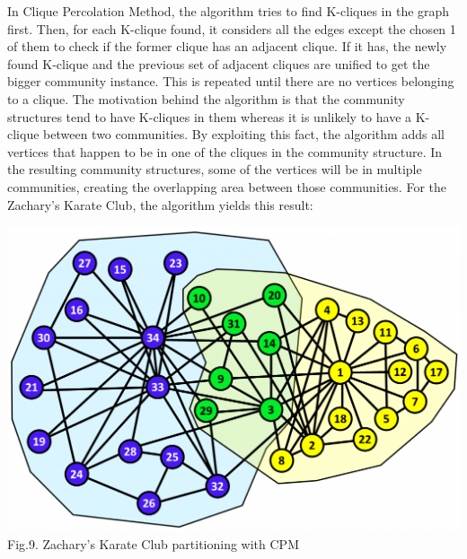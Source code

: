 \documentclass[10pt]{article}
\begin{document}
\begin{figure}[h]%
    \centering
    \qquad
\end{figure}

In Clique Percolation Method, the algorithm tries to find K-cliques in the graph first. Then, for each K-clique found, it considers all the edges except the chosen 1 of them to check if the former clique has an adjacent clique. If it has, the newly found K-clique and the previous set of adjacent cliques are unified to get the bigger community instance. This is repeated until there are no vertices belonging to a clique\cite{eleven}.
The motivation behind the algorithm is that the community structures tend to have K-cliques in them whereas it is unlikely to have a K-clique between two communities. By exploiting this fact, the algorithm adds all vertices that happen to be in one of the cliques in the community structure. In the resulting community structures, some of the vertices will be in multiple communities, creating the overlapping area between those communities. For the Zachary’s Karate Club, the algorithm yields this result: \\

\begin{center}%
    \includegraphics[scale=0.2]{karateclique.png} \\
    Fig.9. Zachary’s Karate Club partitioning with CPM 
\end{center}
\end{document}
